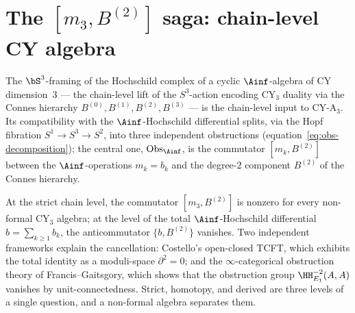 %
%
%
%

\chapter{The \texorpdfstring{$[m_3, B^{(2)}]$}{[m3, B(2)]} saga: chain-level CY algebra}
\label{ch:m3-b2-saga}

The $\bS^3$-framing of the Hochschild complex of a cyclic
$\Ainf$-algebra of CY dimension~$3$ --- the chain-level lift of
the $S^3$-action encoding CY$_3$ duality via the Connes hierarchy
$B^{(0)}, B^{(1)}, B^{(2)}, B^{(3)}$ --- is the chain-level input to
CY-A$_3$.  Its compatibility with the $\Ainf$-Hochschild
differential splits, via the Hopf fibration $S^1 \to S^3 \to S^2$,
into three independent obstructions
(equation~\eqref{eq:obs-decomposition}); the central one,
$\mathrm{Obs}_{\Ainf}$, is the commutator
$[m_k, B^{(2)}]$ between the $\Ainf$-operations
$m_k = b_k$ and the degree-$2$ component $B^{(2)}$ of the
Connes hierarchy.

At the strict chain level, the commutator $[m_3, B^{(2)}]$ is
nonzero for every non-formal CY$_3$ algebra; at the level of the
total $\Ainf$-Hochschild differential $b = \sum_{k \geq 1} b_k$,
the anticommutator $\{b, B^{(2)}\}$ vanishes.  Two independent frameworks explain
the cancellation: Costello's open-closed TCFT, which exhibits the
total identity as a moduli-space $\partial^2 = 0$; and the
$\infty$-categorical obstruction theory of Francis--Gaitsgory,
which shows that the obstruction group
$\HH^{-2}_{E_1}(A, A)$ vanishes by unit-connectedness.  Strict,
homotopy, and derived are three levels of a single question, and
a non-formal algebra separates them.

